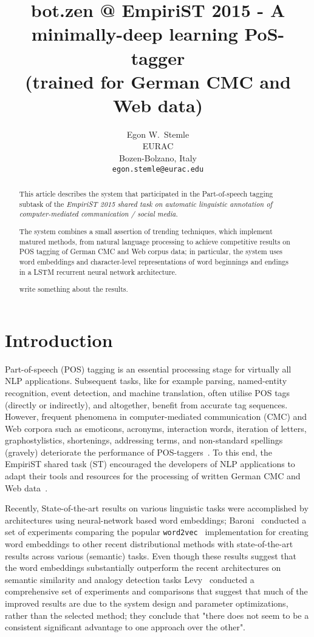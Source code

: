 \documentclass[11pt]{article}
\title{bot.zen @ EmpiriST 2015 - A minimally-deep learning PoS-tagger \\ (trained for German CMC and Web data)}
\author{Egon W.~Stemle \\
  EURAC \\
  Bozen-Bolzano, Italy \\
  {\tt egon.stemle@eurac.edu}} %
\date{}
\begin{document}
\maketitle
\begin{abstract}
    This article describes the system that participated in the Part-of-speech
    tagging subtask of the \emph{EmpiriST 2015 shared task on automatic
    linguistic annotation of computer-mediated communication / social
    media}.

    The system combines a small assertion of trending techniques, which
    implement matured methods, from natural language processing to achieve
    competitive results on POS tagging of German CMC and Web corpus data; in
    particular, the system uses word embeddings and character-level
    representations of word beginnings and endings in a LSTM recurrent neural
    network architecture.

    \fxerror[inline]{}write something about the results.
    
\end{abstract}

\section{Introduction}
\label{sec:intro}

Part-of-speech (POS) tagging is an essential processing stage for virtually all
NLP applications.
Subsequent tasks, like for example parsing, named-entity recognition, event
detection, and machine translation, often utilise POS tags (directly or
indirectly), and altogether, benefit from accurate tag sequences.
However, frequent phenomena in computer-mediated communication (CMC) and Web
corpora such as emoticons, acronyms, interaction words, iteration of letters,
graphostylistics, shortenings, addressing terms, and non-standard
spellings~\cite{crystal2001,androutsopoulos2007,beisswenger2013} (gravely)
deteriorate the performance of POS-taggers~\cite{giesbrecht2009,I13-1041}.
To this end, the EmpiriST shared task (ST) encouraged the developers of NLP
applications to adapt their tools and resources for the processing of written
German CMC and Web data~\cite{empirist2016}.

Recently, State-of-the-art results on various linguistic tasks were
accomplished by architectures using neural-network based word embeddings;
Baroni~ conducted a set of
experiments comparing the popular
\texttt{word2vec}~\cite{DBLP:journals/corr/abs-1301-3781,arXiv:1310.4546}
implementation for creating word embeddings to other recent distributional
methods with state-of-the-art results across various (semantic) tasks. 
Even though these results suggest that the word embeddings substantially
outperform the recent architectures on semantic similarity and analogy
detection tasks Levy~ conducted a comprehensive set of
experiments and comparisons that suggest that much of the improved results are
due to the system design and parameter optimizations, rather than the selected
method; they conclude that "there does not seem to be a consistent significant
advantage to one approach over the other".
\end{document}
